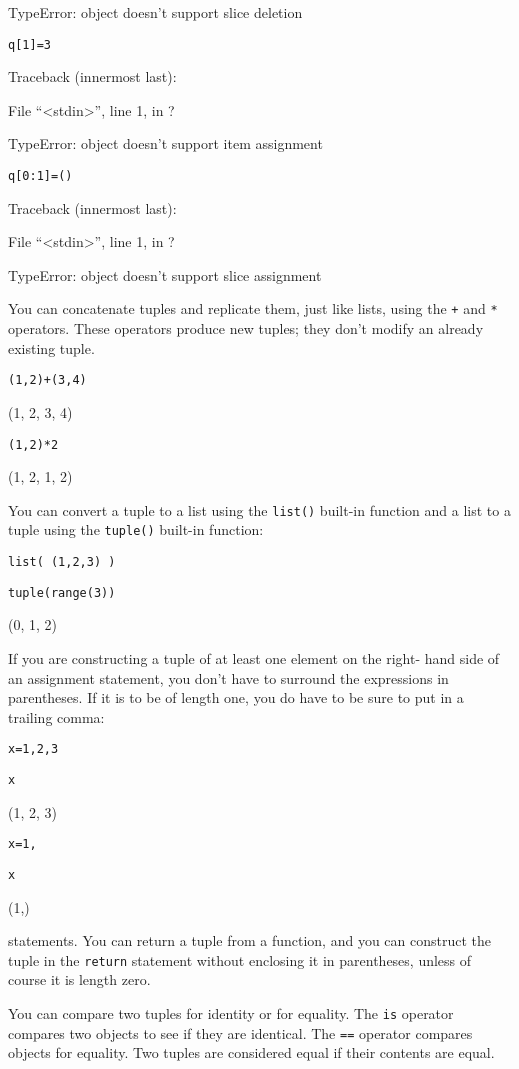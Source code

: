 TypeError: object doesn't support
slice deletion


\texttt{q{[}1{]}=3}

Traceback (innermost last):

 File
``\textless{}stdin\textgreater{}'', line 1, in ?

TypeError: object doesn't support
item assignment


\texttt{q{[}0:1{]}=()}

Traceback (innermost last):

 File
``\textless{}stdin\textgreater{}'', line 1, in ?

TypeError: object doesn't support
slice assignment

You can concatenate tuples and
replicate them, just like lists, using the \texttt{+} and \texttt{*}
operators. These operators produce new tuples; they don't modify an
already existing tuple.


\texttt{(1,2)+(3,4)}

(1, 2, 3, 4)


\texttt{(1,2)*2}

(1, 2, 1, 2)

You can convert a tuple to a list
using the \texttt{list()} built-in function and a list to a tuple using
the \texttt{tuple()} built-in function:


\texttt{list( (1,2,3) )}




\texttt{tuple(range(3))}

(0, 1, 2)

If you are constructing a tuple of
at least one element on the right- hand side of an assignment statement,
you don't have to surround the expressions in parentheses. If it is to
be of length one, you do have to be sure to put in a trailing comma:


\texttt{x=1,2,3}


\texttt{x}

(1, 2, 3)


\texttt{x=1,}


\texttt{x}

(1,)


statements. You can return a tuple from a function, and you can
construct the tuple in the \texttt{return} statement without enclosing it
in parentheses, unless of course it is length zero.

You can compare two tuples for
identity or for equality. The \texttt{is} operator compares two objects to
see if they are identical. The \texttt{==} operator compares objects for
equality. Two tuples are considered equal if their contents are equal.


